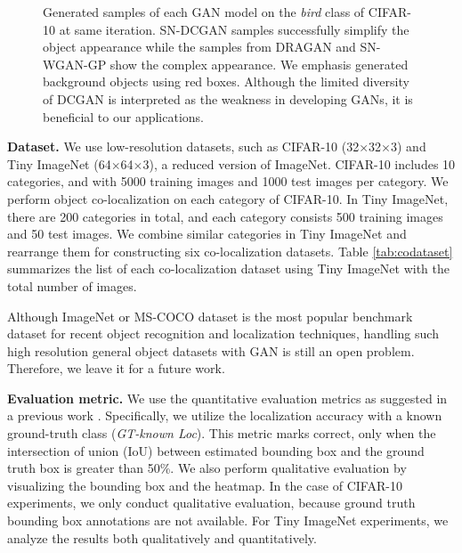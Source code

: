 \documentclass[runningheads]{llncs}
\begin{document}
\begin{figure}[t!]
    \noindent
    \begin{center}
    \end{center}
    \vspace*{-5mm}
    \caption{Generated samples of each GAN model on the \emph{bird} class of CIFAR-10 at same iteration. SN-DCGAN samples successfully simplify the object appearance while the samples from DRAGAN and SN-WGAN-GP show the complex appearance. We emphasis generated background objects using red boxes.  Although the limited diversity of DCGAN is interpreted as the weakness in developing GANs, it is beneficial to our applications.}
\label{fig:cifar10gen}
\vspace*{-5mm}
\end{figure}


\noindent\textbf{Dataset.} We use low-resolution datasets, such as CIFAR-10 (32$\times$32$\times$3) and Tiny ImageNet (64$\times$64$\times$3), a reduced version of ImageNet. CIFAR-10 includes 10 categories, and with 5000 training images and 1000 test images per category. We perform object co-localization on each category of CIFAR-10. In Tiny ImageNet, there are 200 categories in total, and each category consists 500 training images and 50 test images. We combine similar categories in Tiny ImageNet and rearrange them for constructing six co-localization datasets. Table \ref{tab:codataset} summarizes the list of each co-localization dataset using Tiny ImageNet with the total number of images.

Although ImageNet or MS-COCO dataset is the most popular benchmark dataset for recent object recognition and localization techniques, handling such high resolution general object datasets with GAN is still an open problem. Therefore, we leave it for a future work.

\noindent\textbf{Evaluation metric.} We use the quantitative evaluation metrics as suggested in a previous work \cite{singh2017hide}. Specifically, we utilize the localization accuracy with a known ground-truth class (\textit{GT-known Loc}). This metric marks correct, only when the intersection of union (IoU) between estimated bounding box and the ground truth box is greater than 50\%. We also perform qualitative evaluation by visualizing the bounding box and the heatmap. In the case of CIFAR-10 experiments, we only conduct qualitative evaluation, because ground truth bounding box annotations are not available. For Tiny ImageNet experiments, we analyze the results both qualitatively and quantitatively.
\end{document}
